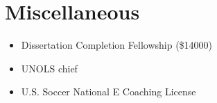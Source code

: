 \section{Miscellaneous}
\begin{itemize}
    \item Dissertation Completion Fellowship (\$14000)
    \item UNOLS chief
    \item U.S. Soccer National E Coaching License  
\end{itemize}
